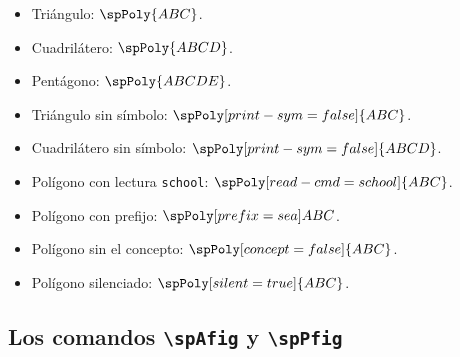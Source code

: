 \documentclass{article}
\begin{document}
\begin{itemize}
  \item Triángulo: $\spPoly{ABC}$.
  \item Cuadrilátero: $\spPoly{ABCD}$.
  \item Pentágono: $\spPoly{ABCDE}$.
  \item Triángulo sin símbolo: $\spPoly[print-sym=false]{ABC}$.
  \item Cuadrilátero sin símbolo: $\spPoly[print-sym=false]{ABCD}$.
  \item Polígono con lectura \texttt{school}: $\spPoly[read-cmd=school]{ABC}$.
  \item Polígono con prefijo: $\spPoly[prefix={sea}]{ABC}$.
  \item Polígono sin el concepto: $\spPoly[concept=false]{ABC}$.
  \item Polígono silenciado: $\spPoly[silent=true]{ABC}$.
\end{itemize}

\subsection*{Los comandos \texttt{\textbackslash spAfig} y \texttt{\textbackslash spPfig}}
\end{document}
